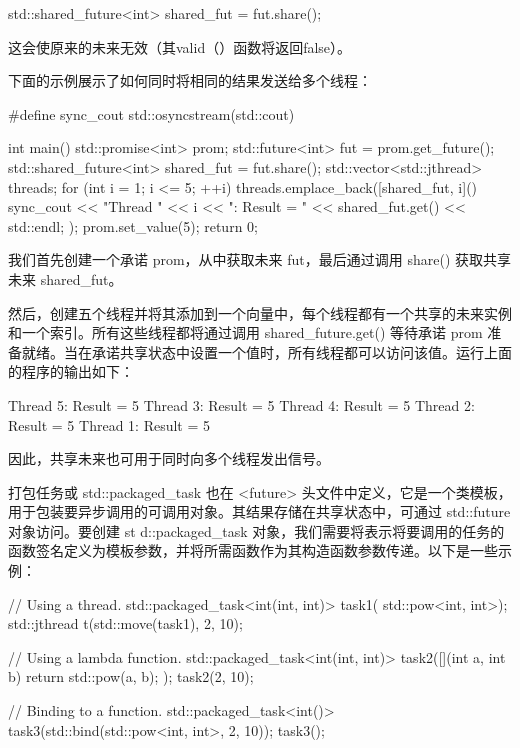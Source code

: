 \begin{cpp}
std::shared_future<int> shared_fut = fut.share();
\end{cpp}

这会使原来的未来无效（其valid（）函数将返回false）。

下面的示例展示了如何同时将相同的结果发送给多个线程：

\begin{cpp}
#define sync_cout std::osyncstream(std::cout)

int main() {
    std::promise<int> prom;
    std::future<int> fut = prom.get_future();
    std::shared_future<int> shared_fut = fut.share();
    std::vector<std::jthread> threads;
    for (int i = 1; i <= 5; ++i) {
        threads.emplace_back([shared_fut, i]() {
            sync_cout << "Thread " << i << ": Result = "
            << shared_fut.get() << std::endl;
        });
    }
    prom.set_value(5);
    return 0;
}
\end{cpp}

我们首先创建一个承诺 prom，从中获取未来 fut，最后通过调用 share() 获取共享未来 shared\_fut。

然后，创建五个线程并将其添加到一个向量中，每个线程都有一个共享的未来实例和一个索引。所有这些线程都将通过调用 shared\_future.get() 等待承诺 prom 准备就绪。当在承诺共享状态中设置一个值时，所有线程都可以访问该值。运行上面的程序的输出如下：

\begin{shell}
Thread 5: Result = 5
Thread 3: Result = 5
Thread 4: Result = 5
Thread 2: Result = 5
Thread 1: Result = 5
\end{shell}

因此，共享未来也可用于同时向多个线程发出信号。


打包任务或 std::packaged\_task 也在 <future> 头文件中定义，它是一个类模板，用于包装要异步调用的可调用对象。其结果存储在共享状态中，可通过 std::future 对象访问。要创建 st d::packaged\_task 对象，我们需要将表示将要调用的任务的函数签名定义为模板参数，并将所需函数作为其构造函数参数传递。以下是一些示例：

\begin{cpp}
// Using a thread.
std::packaged_task<int(int, int)> task1(
                       std::pow<int, int>);
std::jthread t(std::move(task1), 2, 10);

// Using a lambda function.
std::packaged_task<int(int, int)> task2([](int a, int b)
{
    return std::pow(a, b);
});
task2(2, 10);

// Binding to a function.
std::packaged_task<int()> task3(std::bind(std::pow<int, int>, 2, 10));
task3();
\end{cpp}

